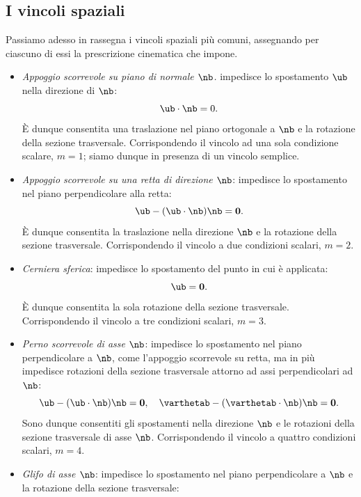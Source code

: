 \subsection{I vincoli spaziali}
Passiamo adesso in rassegna i vincoli spaziali più comuni, assegnando per ciascuno di essi la prescrizione cinematica che impone.
\begin{itemize}
	\item \textit{Appoggio scorrevole su piano di normale $\nb$.} impedisce lo spostamento $\ub$ nella direzione di $\nb$:
	\begin{equation}
		\ub\cdot\nb=0 .
	\end{equation}
	È dunque consentita una traslazione nel piano ortogonale a $\nb$ e la rotazione della sezione trasversale.  Corrispondendo  il vincolo ad una sola condizione scalare, $m=1$; siamo  dunque in presenza di un vincolo semplice.
\item \emph{Appoggio scorrevole su una retta di direzione $\nb$}: impedisce lo spostamento nel piano perpendicolare alla retta:
\begin{equation}
	\ub-(\ub\cdot\nb)\nb=\mathbf{0}.
\end{equation}
È dunque consentita la traslazione nella direzione $\nb$ e la rotazione della sezione trasversale. Corrispondendo il vincolo a due  condizioni scalari, $m=2$.
\item \emph{Cerniera sferica}: impedisce lo spostamento del punto in cui è applicata:
\begin{equation}
	\ub=\mathbf{0}.
\end{equation}
È dunque consentita la sola rotazione della sezione trasversale. Corrispondendo il vincolo a tre  condizioni scalari, $m=3$.
\item \emph{Perno scorrevole di asse $\nb$}: impedisce lo spostamento nel piano perpendicolare a $\nb$, come l'appoggio scorrevole su retta, ma in più impedisce rotazioni della sezione trasversale attorno ad assi perpendicolari ad $\nb$:
\begin{equation}
	\ub- (\ub\cdot\nb)\nb=\mathbf{0}, \quad \varthetab- (\varthetab\cdot\nb)\nb=\mathbf{0}.
\end{equation}
Sono dunque consentiti gli spostamenti nella direzione $\nb$ e le rotazioni della sezione trasversale di asse $\nb$. 
Corrispondendo il vincolo a quattro  condizioni scalari, $m=4$.
\item \emph{Glifo  di asse $\nb$}: impedisce lo spostamento nel piano perpendicolare a $\nb$ e la rotazione della sezione trasversale:
\begin{equation}

\end{equation}
\end{itemize}
